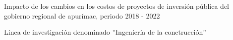 \newpage
\pagestyle{plain}
\noindent Impacto de los cambios en los costos de proyectos de inversión pública del gobierno regional de apurímac, periodo 2018 - 2022\

\noindent Linea de investigación denominado ''Ingeniería de la conctrucción''
\doclicenseThis%

	



